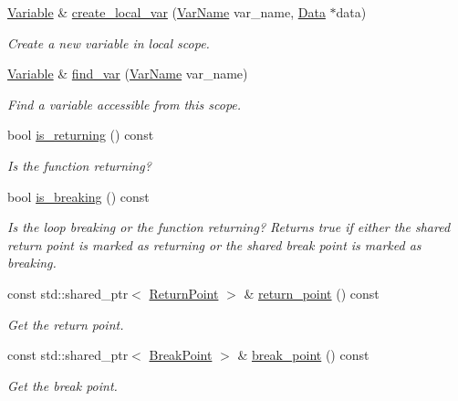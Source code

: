 \begin{DoxyCompactItemize}
\item 
\hyperlink{classcreek_1_1_variable}{Variable} \& \hyperlink{classcreek_1_1_scope_a8c3c1fc5c39dcd1c5ff5edc50ccd6412}{create\+\_\+local\+\_\+var} (\hyperlink{classcreek_1_1_var_name}{Var\+Name} var\+\_\+name, \hyperlink{classcreek_1_1_data}{Data} $\ast$data)
\begin{DoxyCompactList}\small\item\em Create a new variable in local scope. \end{DoxyCompactList}\item 
\hyperlink{classcreek_1_1_variable}{Variable} \& \hyperlink{classcreek_1_1_scope_a2fa918f10a89190166786b204e5e865e}{find\+\_\+var} (\hyperlink{classcreek_1_1_var_name}{Var\+Name} var\+\_\+name)
\begin{DoxyCompactList}\small\item\em Find a variable accessible from this scope. \end{DoxyCompactList}\item 
bool \hyperlink{classcreek_1_1_scope_ae34e6c7489d66a8a07b8bdde1ba0eb73}{is\+\_\+returning} () const 
\begin{DoxyCompactList}\small\item\em Is the function returning? \end{DoxyCompactList}\item 
bool \hyperlink{classcreek_1_1_scope_aabcd46e87531709fedc7d3cdf79cbc3b}{is\+\_\+breaking} () const \hypertarget{classcreek_1_1_scope_aabcd46e87531709fedc7d3cdf79cbc3b}{}\label{classcreek_1_1_scope_aabcd46e87531709fedc7d3cdf79cbc3b}

\begin{DoxyCompactList}\small\item\em Is the loop breaking or the function returning? Returns {\ttfamily true} if either the shared return point is marked as returning or the shared break point is marked as breaking. \end{DoxyCompactList}\item 
const std\+::shared\+\_\+ptr$<$ \hyperlink{structcreek_1_1_scope_1_1_return_point}{Return\+Point} $>$ \& \hyperlink{classcreek_1_1_scope_ae3e20c701eae578a841953252a972395}{return\+\_\+point} () const \hypertarget{classcreek_1_1_scope_ae3e20c701eae578a841953252a972395}{}\label{classcreek_1_1_scope_ae3e20c701eae578a841953252a972395}

\begin{DoxyCompactList}\small\item\em Get the return point. \end{DoxyCompactList}\item 
const std\+::shared\+\_\+ptr$<$ \hyperlink{structcreek_1_1_scope_1_1_break_point}{Break\+Point} $>$ \& \hyperlink{classcreek_1_1_scope_aa42d3e37bf28ef05ccd80eb6c4cce4d9}{break\+\_\+point} () const \hypertarget{classcreek_1_1_scope_aa42d3e37bf28ef05ccd80eb6c4cce4d9}{}\label{classcreek_1_1_scope_aa42d3e37bf28ef05ccd80eb6c4cce4d9}

\begin{DoxyCompactList}\small\item\em Get the break point. \end{DoxyCompactList}\end{DoxyCompactItemize}


